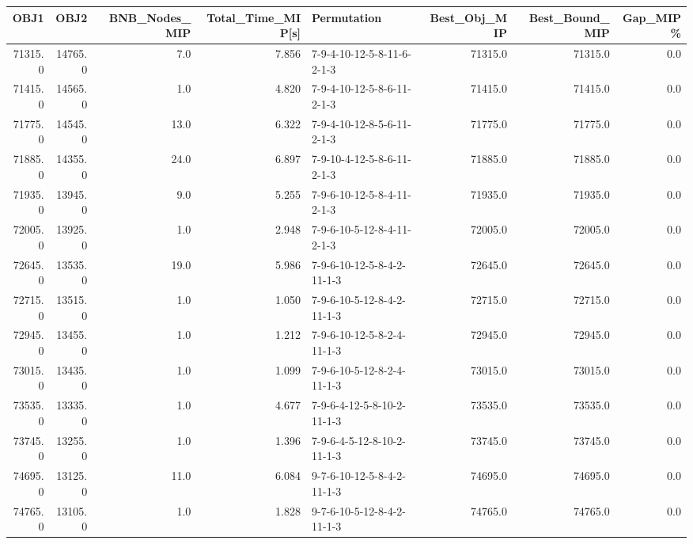 \begin{tabular}{rrrrlrrr}
\toprule
    OBJ1 &     OBJ2 &  BNB\_Nodes\_MIP &  Total\_Time\_MIP[s] &                 Permutation &  Best\_Obj\_MIP &  Best\_Bound\_MIP &  Gap\_MIP\% \\
\midrule
 71315.0 &  14765.0 &            7.0 &              7.856 &  7-9-4-10-12-5-8-11-6-2-1-3 &       71315.0 &         71315.0 &       0.0 \\
 71415.0 &  14565.0 &            1.0 &              4.820 &  7-9-4-10-12-5-8-6-11-2-1-3 &       71415.0 &         71415.0 &       0.0 \\
 71775.0 &  14545.0 &           13.0 &              6.322 &  7-9-4-10-12-8-5-6-11-2-1-3 &       71775.0 &         71775.0 &       0.0 \\
 71885.0 &  14355.0 &           24.0 &              6.897 &  7-9-10-4-12-5-8-6-11-2-1-3 &       71885.0 &         71885.0 &       0.0 \\
 71935.0 &  13945.0 &            9.0 &              5.255 &  7-9-6-10-12-5-8-4-11-2-1-3 &       71935.0 &         71935.0 &       0.0 \\
 72005.0 &  13925.0 &            1.0 &              2.948 &  7-9-6-10-5-12-8-4-11-2-1-3 &       72005.0 &         72005.0 &       0.0 \\
 72645.0 &  13535.0 &           19.0 &              5.986 &  7-9-6-10-12-5-8-4-2-11-1-3 &       72645.0 &         72645.0 &       0.0 \\
 72715.0 &  13515.0 &            1.0 &              1.050 &  7-9-6-10-5-12-8-4-2-11-1-3 &       72715.0 &         72715.0 &       0.0 \\
 72945.0 &  13455.0 &            1.0 &              1.212 &  7-9-6-10-12-5-8-2-4-11-1-3 &       72945.0 &         72945.0 &       0.0 \\
 73015.0 &  13435.0 &            1.0 &              1.099 &  7-9-6-10-5-12-8-2-4-11-1-3 &       73015.0 &         73015.0 &       0.0 \\
 73535.0 &  13335.0 &            1.0 &              4.677 &  7-9-6-4-12-5-8-10-2-11-1-3 &       73535.0 &         73535.0 &       0.0 \\
 73745.0 &  13255.0 &            1.0 &              1.396 &  7-9-6-4-5-12-8-10-2-11-1-3 &       73745.0 &         73745.0 &       0.0 \\
 74695.0 &  13125.0 &           11.0 &              6.084 &  9-7-6-10-12-5-8-4-2-11-1-3 &       74695.0 &         74695.0 &       0.0 \\
 74765.0 &  13105.0 &            1.0 &              1.828 &  9-7-6-10-5-12-8-4-2-11-1-3 &       74765.0 &         74765.0 &       0.0 \\

\end{tabular}
